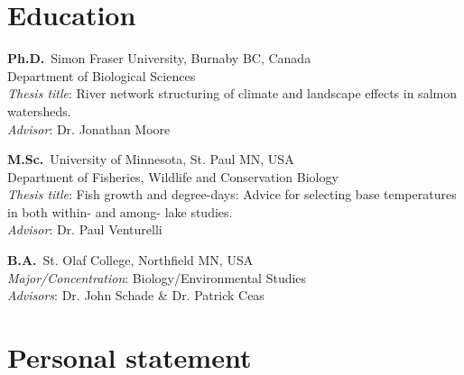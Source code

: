 \section{Education}

\begin{description}
\tightlist
\item[2013--(\textit{Exp.}19)]
\textbf{Ph.D.}\ Simon Fraser University, Burnaby BC, Canada\\
Department of Biological Sciences\\
\textit{Thesis title}: River network structuring of climate and landscape effects in salmon watersheds.\\
\textit{Advisor}: Dr. Jonathan Moore\\

\item[2011--13]
\textbf{M.Sc.}\ University of Minnesota, St. Paul MN, USA\\
Department of Fisheries, Wildlife and Conservation Biology\\
\textit{Thesis title}: Fish growth and degree-days: Advice for selecting base temperatures in both within- and among- lake studies.\\
\textit{Advisor}: Dr. Paul Venturelli\\

\item[2005--09]
\textbf{B.A.}\ St. Olaf College, Northfield MN, USA\\
\textit{Major/Concentration}: Biology/Environmental Studies\\
\textit{Advisors}: Dr. John Schade \& Dr. Patrick Ceas\\
\end{description}



\section{Personal statement}

